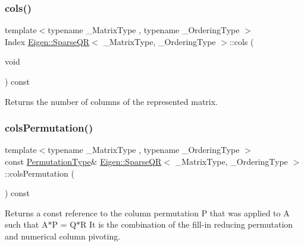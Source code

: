 \subsubsection{\texorpdfstring{cols()}{cols()}}
{\footnotesize\ttfamily template$<$typename \+\_\+\+Matrix\+Type , typename \+\_\+\+Ordering\+Type $>$ \\
Index \mbox{\hyperlink{class_eigen_1_1_sparse_q_r}{Eigen\+::\+Sparse\+QR}}$<$ \+\_\+\+Matrix\+Type, \+\_\+\+Ordering\+Type $>$\+::cols (\begin{DoxyParamCaption}\item[{void}]{ }\end{DoxyParamCaption}) const\hspace{0.3cm}{\ttfamily [inline]}}

\begin{DoxyReturn}{Returns}
the number of columns of the represented matrix. 
\end{DoxyReturn}
\mbox{\label{class_eigen_1_1_sparse_q_r_a140930ebbf89dfd57a173761716db38f}} 
\subsubsection{\texorpdfstring{colsPermutation()}{colsPermutation()}}
{\footnotesize\ttfamily template$<$typename \+\_\+\+Matrix\+Type , typename \+\_\+\+Ordering\+Type $>$ \\
const \mbox{\hyperlink{class_eigen_1_1_permutation_matrix}{Permutation\+Type}}\& \mbox{\hyperlink{class_eigen_1_1_sparse_q_r}{Eigen\+::\+Sparse\+QR}}$<$ \+\_\+\+Matrix\+Type, \+\_\+\+Ordering\+Type $>$\+::cols\+Permutation (\begin{DoxyParamCaption}{ }\end{DoxyParamCaption}) const\hspace{0.3cm}{\ttfamily [inline]}}

\begin{DoxyReturn}{Returns}
a const reference to the column permutation P that was applied to A such that A$\ast$P = Q$\ast$R It is the combination of the fill-\/in reducing permutation and numerical column pivoting. 
\end{DoxyReturn}
\mbox{\label{class_eigen_1_1_sparse_q_r_aedaf52b7543de4d55c58c8f830c2aeb7}} 
